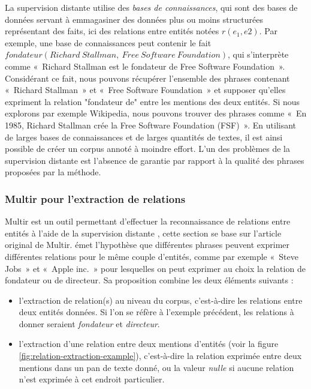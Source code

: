 \documentclass[12pt,a4paper,times,twoside,openright]{report}
\begin{document}
La supervision distante utilise des \emph{bases de connaissances}, qui sont des bases de données servant à emmagasiner des données plus ou moins structurées représentant des faits, ici des relations entre entités notées $r(e_{1},e{2})$. Par exemple, une base de connaissances peut contenir le fait $fondateur(Richard\ Stallman,\ Free\ Software\ Foundation)$, qui s'interprète comme «\ Richard Stallman est le fondateur de Free Software Foundation\ ». Considérant ce fait, nous pouvons récupérer l'ensemble des phrases contenant «\ Richard Stallman\ » et «\ Free Software Foundation\ » et supposer qu'elles expriment la relation "fondateur de" entre les mentions des deux entités. Si nous explorons par exemple Wikipedia, nous pouvons trouver des phrases comme «\ En 1985, Richard Stallman crée la Free Software Foundation (FSF)\ ». En utilisant de larges bases de connaissances et de larges quantités de textes, il est ainsi possible de créer un corpus annoté à moindre effort. L'un des problèmes de la supervision distante est l'absence de garantie par rapport à la qualité des phrases proposées par la méthode.



        
        \subsubsection{Multir pour l'extraction de relations}
        \label{subsec:imm-multir}
Multir \citep{hoffmann2011knowledge} est un outil permettant d'effectuer la reconnaissance de relations entre entités à l'aide de la supervision distante \citep{mintz2009distant}, cette section se base sur l'article original de Multir. \citet{hoffmann2011knowledge} émet l'hypothèse que différentes phrases peuvent exprimer différentes relations pour le même couple d'entités, comme par exemple «\ Steve Jobs\ » et «\ Apple inc.\ » pour lesquelles on peut exprimer au choix la relation de fondateur ou de directeur. Sa proposition combine les deux éléments suivants :

\begin{itemize}
\item l'extraction de relation(s) au niveau du corpus, c'est-à-dire les relations entre deux entités données. Si l'on se réfère à l'exemple précédent, les relations à donner seraient \emph{fondateur} et \emph{directeur}.
\item l'extraction d'une relation entre deux mentions d'entités (voir la figure \ref{fig:relation-extraction-example}), c'est-à-dire la relation exprimée entre deux mentions dans un pan de texte donné, ou la valeur \emph{nulle} si aucune relation n'est exprimée à cet endroit particulier.
\end{itemize}
\end{document}
